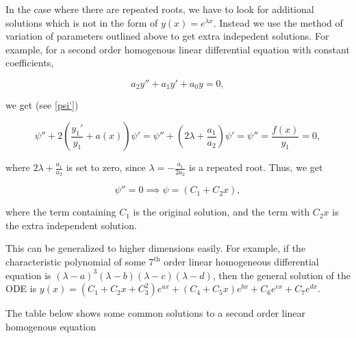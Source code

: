 \documentclass[english,a4paper,12pt]{report}
\begin{document}
In the case where there are repeated roots, we have to look for additional solutions which is not in the form of \(y(x) = e^{\lambda x} \). Instead we use the method of variation of parameters outlined above to get extra indepedent solutions. For example, for a second order homogenous linear differential equation with constant coefficients, 

\begin{equation}
    a_2 y'' + a_1 y' + a_0 y = 0, \label{secondlinear} 
\end{equation}

we get (see \cref{psi'})

\begin{equation}
    \psi '' + 2 \left(\frac{y_1 '}{y_1 } + a(x) \right)\psi' = \psi '' + \left(2\lambda + \frac{a_1 }{a_2 } \right)\psi ' = \psi '' = \frac{f(x)}{y_1 } = 0,
\end{equation}

where \(\displaystyle 2\lambda + \frac{a_1 }{a_2 } \) is set to zero, since \(\displaystyle \lambda = -\frac{a_1 }{2a_2 } \) is a repeated root. Thus, we get

\begin{equation}
    \psi '' = 0 \implies \psi = (C_1 + C_2 x),
\end{equation}

where the term containing \(C_1 \) is the original solution, and the term with \(C_2 x\) is the extra independent solution. 

This can be generalized to higher dimensions easily. For example, if the characteristic polynomial of some \(7^{\text{th}} \) order linear homogeneous differential equation is \((\lambda -a)^3 (\lambda -b)(\lambda - c)(\lambda - d)\), then the general solution of the ODE is \(\displaystyle y(x) = (C_1 +C_2 x+C_3 ^2)e^{ax} + (C_4 +C_5x )e^{bx} + C_6 e^{cx} + C_7 e^{dx}    \).    

The table below shows some common solutions to a second order linear homogenous equation

\renewcommand{\arraystretch}{1.5} %
\end{document}

